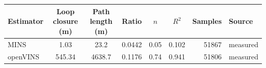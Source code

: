 \begin{tabular}{@{}lS[table-format=6.2]S[table-format=6.1]S[table-format=1.4]S[table-format=+1.2]S[table-format=1.3]rl@{}}
\toprule
Estimator & {Loop closure (\si{\meter})} & {Path length (\si{\meter})} & {Ratio} & {$n$} & {$R^2$} & {Samples} & Source \\
\midrule
MINS & 1.03 & 23.2 & 0.0442 & 0.05 & 0.102 & 51867 & measured \\
openVINS & 545.34 & 4638.7 & 0.1176 & 0.74 & 0.941 & 51806 & measured \\
\bottomrule
\end{tabular}


